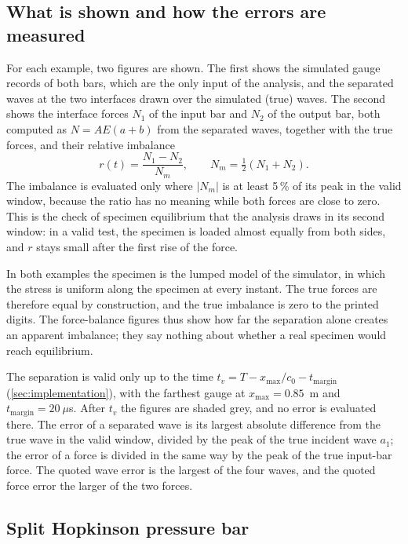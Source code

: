 \documentclass[11pt,a4paper,numbers=noenddot,abstract=true]{scrartcl}
\begin{document}
\subsection{What is shown and how the errors are measured}

For each example, two figures are shown. The first shows the simulated gauge records of both bars, which are the
only input of the analysis, and the separated waves at the two interfaces drawn over the simulated (true) waves.
The second shows the interface forces $N_1$ of the input bar and $N_2$ of the output bar, both computed as
$N = A E (a + b)$ from the separated waves, together with the true forces, and their relative imbalance
\begin{equation}
  r(t) = \frac{N_1 - N_2}{N_m}, \qquad N_m = \tfrac{1}{2}(N_1 + N_2).
\end{equation}
The imbalance is evaluated only where $|N_m|$ is at least 5\,\% of its peak in the valid window, because the ratio
has no meaning while both forces are close to zero. This is the check of specimen equilibrium that the analysis
draws in its second window: in a valid test, the specimen is loaded almost equally from both sides, and $r$ stays
small after the first rise of the force.

In both examples the specimen is the lumped model of the simulator, in which the stress is uniform along the
specimen at every instant. The true forces are therefore equal by construction, and the true imbalance is zero
to the printed digits. The force-balance figures thus show how far the separation alone creates an apparent
imbalance; they say nothing about whether a real specimen would reach equilibrium.

The separation is valid only up to the time $t_v = T - x_\mathrm{max} / c_0 - t_\mathrm{margin}$
(\cref{sec:implementation}), with the farthest gauge at $x_\mathrm{max} = 0.85$~m and $t_\mathrm{margin} = 20~\mu$s.
After $t_v$ the figures are shaded grey, and no error is evaluated there. The error of a separated wave is its
largest absolute difference from the true wave in the valid window, divided by the peak of the true incident wave
$a_1$; the error of a force is divided in the same way by the peak of the true input-bar force. The quoted wave
error is the largest of the four waves, and the quoted force error the larger of the two forces.

\subsection{Split Hopkinson pressure bar}
\end{document}
